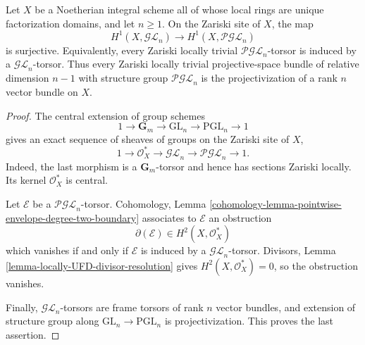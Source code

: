\begin{lemma}
\label{lemma-locally-UFD-projective-linear-torsors-lift}
\begin{reference}
\cite[Chapter III, \S 3.4, Proposition 3.4.1, p. 161]{Tohoku}
\end{reference}
Let $X$ be a Noetherian integral scheme all of whose local rings are unique
factorization domains, and let $n\geq1$. On the Zariski site of $X$, the map
\[
H^1(X,\mathcal{GL}_n)\longrightarrow H^1(X,\mathcal{PGL}_n)
\]
is surjective. Equivalently, every Zariski locally trivial
$\mathcal{PGL}_n$-torsor is induced by a $\mathcal{GL}_n$-torsor. Thus every
Zariski locally trivial projective-space bundle of relative dimension
$n-1$ with structure group $\mathcal{PGL}_n$ is the projectivization of a
rank $n$ vector bundle on $X$.
\end{lemma}

\begin{proof}
The central extension of group schemes
\[
1\longrightarrow\mathbf G_m\longrightarrow\mathrm{GL}_n
\longrightarrow\mathrm{PGL}_n\longrightarrow1
\]
gives an exact sequence of sheaves of groups on the Zariski site of $X$,
\[
1\longrightarrow\mathcal O_X^*\longrightarrow\mathcal{GL}_n
\longrightarrow\mathcal{PGL}_n\longrightarrow1.
\]
Indeed, the last morphism is a $\mathbf G_m$-torsor and hence has sections
Zariski locally. Its kernel $\mathcal O_X^*$ is central.

Let $\mathcal E$ be a $\mathcal{PGL}_n$-torsor. Cohomology, Lemma
\ref{cohomology-lemma-pointwise-envelope-degree-two-boundary} associates to
$\mathcal E$ an obstruction
\[
\partial(\mathcal E)\in H^2(X,\mathcal O_X^*)
\]
which vanishes if and only if $\mathcal E$ is induced by a
$\mathcal{GL}_n$-torsor. Divisors, Lemma
\ref{lemma-locally-UFD-divisor-resolution} gives
$H^2(X,\mathcal O_X^*)=0$, so the obstruction vanishes.

Finally, $\mathcal{GL}_n$-torsors are frame torsors of rank $n$ vector
bundles, and extension of structure group along
$\mathrm{GL}_n\to\mathrm{PGL}_n$ is projectivization. This proves the last
assertion.
\end{proof}

